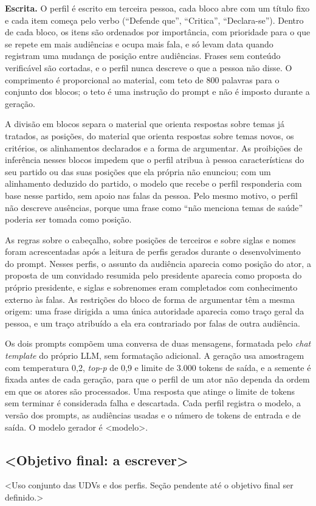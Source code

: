 \textbf{Escrita.} O perfil é escrito em terceira pessoa, cada bloco abre com um título fixo e cada
item começa pelo verbo (``Defende que'', ``Critica'', ``Declara-se''). Dentro de cada bloco, os
itens são ordenados por importância, com prioridade para o que se repete em mais audiências e ocupa
mais fala, e só levam data quando registram uma mudança de posição entre audiências. Frases sem
conteúdo verificável são cortadas, e o perfil nunca descreve o que a pessoa não disse. O comprimento
é proporcional ao material, com teto de 800 palavras para o conjunto dos blocos; o teto é uma
instrução do prompt e não é imposto durante a geração.

A divisão em blocos separa o material que orienta respostas sobre temas já tratados, as posições, do
material que orienta respostas sobre temas novos, os critérios, os alinhamentos declarados e a forma
de argumentar. As proibições de inferência nesses blocos impedem que o perfil atribua à pessoa
características do seu partido ou das suas posições que ela própria não enunciou; com um alinhamento
deduzido do partido, o modelo que recebe o perfil responderia com base nesse partido, sem apoio nas
falas da pessoa. Pelo mesmo motivo, o perfil não descreve ausências, porque uma frase como ``não
menciona temas de saúde'' poderia ser tomada como posição.

As regras sobre o cabeçalho, sobre posições de terceiros e sobre siglas e nomes foram acrescentadas
após a leitura de perfis gerados durante o desenvolvimento do prompt. Nesses perfis, o assunto da
audiência aparecia como posição do ator, a proposta de um convidado resumida pelo presidente
aparecia como proposta do próprio presidente, e siglas e sobrenomes eram completados com
conhecimento externo às falas. As restrições do bloco de forma de argumentar têm a mesma origem: uma
frase dirigida a uma única autoridade aparecia como traço geral da pessoa, e um traço atribuído a
ela era contrariado por falas de outra audiência.

Os dois prompts compõem uma conversa de duas mensagens, formatada pelo \textit{chat template} do
próprio LLM, sem formatação adicional. A geração usa amostragem com temperatura 0,2, \textit{top-p} de 0,9 e limite de
3.000 tokens de saída, e a semente é fixada antes de cada geração, para que o perfil de um ator não
dependa da ordem em que os atores são processados. Uma resposta que atinge o limite de tokens sem
terminar é considerada falha e descartada. Cada perfil registra o modelo, a versão dos prompts, as
audiências usadas e o número de tokens de entrada e de saída. O modelo gerador é <modelo>.


\subsection{<Objetivo final: a escrever>}
\label{sec:metodo-objetivo}

<Uso conjunto das UDVs e dos perfis. Seção pendente até o objetivo final ser definido.>
